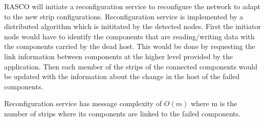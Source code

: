 RASCO will initiate a reconfiguration service to reconfigure the network to adapt
to the new strip configurations. Reconfiguration service is implemented by
a distributed algorithm which is inititated by the detected nodes. First the
initiator node would have to identify the components that are reading/writing
data with the components carried by the dead host. This would be done by
requesting the link information between components at the higher level provided
by the application. Then each member of the strips of the connected components
would be updated with the information about the change in the host of the
failed components.

Reconfiguration service has message complexity of $O(m)$ where m is the
number of strips where its components are linked to the failed components.

